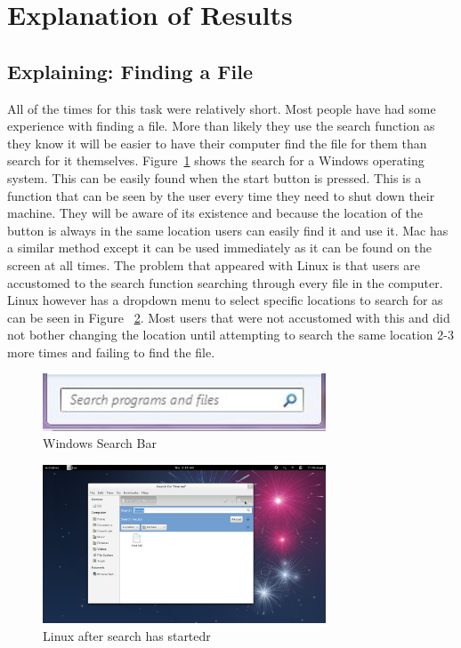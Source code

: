 \documentclass[11pt]{article}
\begin{document}
\section{Explanation of Results}


\subsection{Explaining: Finding a File}
All of the times for this task were relatively short. Most people have had some experience with finding a file. More than likely they use the search function as they know it will be easier to have their computer find the file for them than search for it themselves. Figure~\ref{SearchWin} shows the search for a Windows operating system. This can be easily found when the start button is pressed. This is a function that can be seen by the user every time they need to shut down their machine. They will be aware of its existence and because the location of the button is always in the same location users can easily find it and use it. Mac has a similar method except it can be used immediately as it can be found on the screen at all times. The problem that appeared with Linux is that users are accustomed to the search function searching through every file in the computer. Linux however has a dropdown menu to select specific locations to search for as can be seen in Figure ~\ref{SearchLinAfter}. Most users that were not accustomed with this and did not bother changing the location until attempting to search the same location 2-3 more times and failing to find the file.

\begin{figure}[h!]
  \centering
    \includegraphics[width=0.75\textwidth]{./Images/Search_Windows}
  \caption{Windows Search Bar}
 \label{SearchWin}
\end{figure}

\begin{figure}[h!]
  \centering
    \includegraphics[width=0.75\textwidth]{./Images/Linux_Search_After}
  \caption{Linux after search has startedr}
 \label{SearchLinAfter}
\end{figure}
\end{document}
